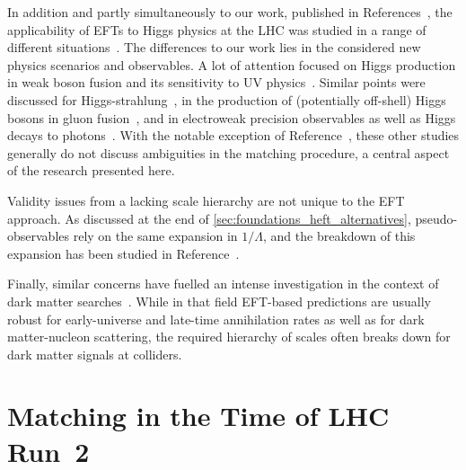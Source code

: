 \newparagraph
%
In addition and partly simultaneously to our work, published in
References~\cite{Brehmer:2015rna, Biekotter:2016ecg}, the
applicability of EFTs to Higgs physics at the LHC was studied in a
range of different situations~\cite{Biekoetter:2014jwa,
  Arnesen:2008fb, Englert:2014cva, deVries:2014apa, Craig:2014una,
  Dawson:2015gka, Edezhath:2015lga, Gorbahn:2015gxa,
  Edelhaeuser:2015zra, Drozd:2015kva, Englert:2015hrx,
  Contino:2016jqw, Freitas:2016iwx, deFlorian:2016spz}. The
differences to our work lies in the considered new physics scenarios
and observables. A lot of attention focused on Higgs production in
weak boson fusion and its sensitivity to UV
physics~\cite{Alwall:2007ed, Hagiwara:2009wt, Englert:2012xt,
  Brehmer:2014pka}. Similar points were discussed for
Higgs-strahlung~\cite{Biekoetter:2014jwa}, in the production of
(potentially off-shell) Higgs bosons in gluon
fusion~\cite{Azatov:2014jga, Buschmann:2014sia, Dawson:2015gka,
  Drozd:2015kva, Azatov:2016xik}, and in electroweak precision
observables as well as Higgs decays to
photons~\cite{Freitas:2016iwx}. With the notable exception of
Reference~\cite{Freitas:2016iwx}, these other studies generally do not
discuss ambiguities in the matching procedure, a central aspect of the
research presented here.

Validity issues from a lacking scale hierarchy are not unique to the
EFT approach. As discussed at the end of
\autoref{sec:foundations_heft_alternatives}, pseudo-observables rely
on the same expansion in $1/\Lambda$, and the breakdown of this
expansion has been studied in Reference~\cite{Greljo:2015sla}.

Finally, similar concerns have fuelled an intense investigation in the
context of dark matter searches~\cite{Shoemaker:2011vi,
  Busoni:2013lha, Buchmueller:2013dya, Busoni:2014sya, Racco:2015dxa,
  Bauer:2016pug}.  While in that field EFT-based predictions are
usually robust for early-universe and late-time annihilation rates as
well as for dark matter-nucleon scattering, the required hierarchy of
scales often breaks down for dark matter signals at colliders.



\section{Matching in the Time of LHC Run~2}
\label{sec:validity_matching}

